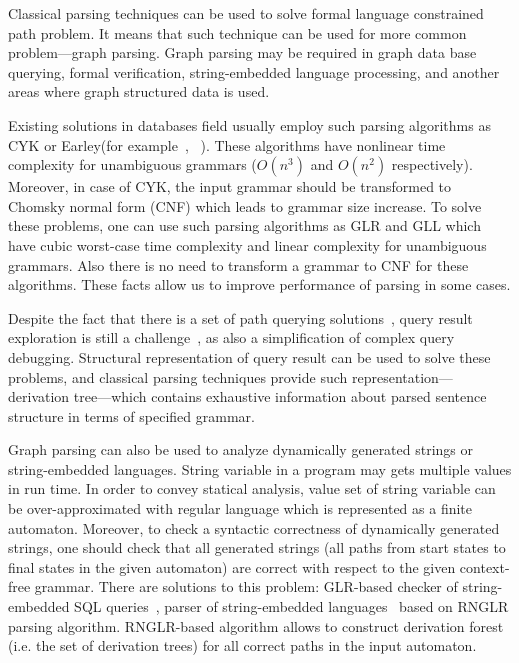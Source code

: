\documentclass{sig-alternate} %
\begin{document}
Classical parsing techniques can be used to solve formal language constrained path problem.
It means that such technique can be used for more common problem---graph parsing. 
Graph parsing may be required in graph data base querying, formal verification, string-embedded language processing, and another areas where graph structured data is used. 

Existing solutions in databases field usually employ such parsing algorithms as CYK or Earley(for example~\cite{ConjCFPathQuery}, ~\cite{GraphQueryWithEarley}). 
These algorithms have nonlinear time complexity for unambiguous grammars ($O(n^3)$ and $O(n^2)$ respectively).
Moreover, in case of CYK, the input grammar should be transformed to Chomsky normal form (CNF) which leads to grammar size increase.
To solve these problems, one can use such parsing algorithms as GLR and GLL which have cubic worst-case time complexity and linear complexity for unambiguous grammars.
Also there is no need to transform a grammar to CNF for these algorithms.
These facts allow us to improve performance of parsing in some cases.

Despite the fact that there is a set of path querying solutions~\cite{GraphQueryWithEarley, ConjCFPathQuery, !!!}, query result exploration is still a challenge~\cite{hofman2015separabilityForRegQueryDebugging}, as also a simplification of complex query debugging.
Structural representation of query result can be used to solve these problems, and classical parsing techniques provide such representation---derivation tree---which contains exhaustive information about parsed sentence structure in terms of specified grammar.

Graph parsing can also be used to analyze dynamically generated strings or string-embedded languages. 
String variable in a program may gets multiple values in run time.
In order to convey statical analysis, value set of string variable can be over-approximated with regular language which is represented as a finite automaton.
Moreover, to check a syntactic correctness of dynamically generated strings, one should check that all generated strings (all paths from start states to final states in the given automaton) are correct with respect to the given context-free grammar. 
There are solutions to this problem: GLR-based checker of string-embedded SQL queries~\cite{Alvor1, Alvor2},
 parser of string-embedded languages~\cite{relaxedRNGLR} based on RNGLR parsing algorithm.
RNGLR-based algorithm allows to construct derivation forest (i.e. the set of derivation trees) for all correct paths in the input automaton.
\end{document}
